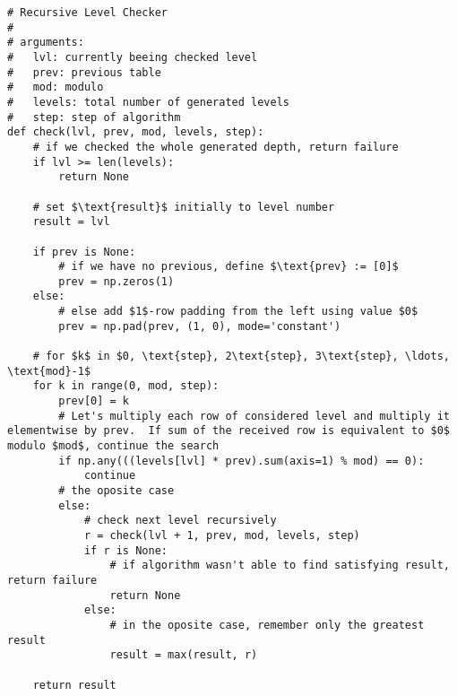 \documentclass{article}
\begin{document}
\begin{verbatim}
# Recursive Level Checker
#
# arguments:
#   lvl: currently beeing checked level
#   prev: previous table
#   mod: modulo
#   levels: total number of generated levels
#   step: step of algorithm
def check(lvl, prev, mod, levels, step):
    # if we checked the whole generated depth, return failure
    if lvl >= len(levels):
        return None

    # set $\text{result}$ initially to level number
    result = lvl

    if prev is None:
        # if we have no previous, define $\text{prev} := [0]$
        prev = np.zeros(1)
    else:
        # else add $1$-row padding from the left using value $0$
        prev = np.pad(prev, (1, 0), mode='constant')

    # for $k$ in $0, \text{step}, 2\text{step}, 3\text{step}, \ldots, \text{mod}-1$
    for k in range(0, mod, step):
        prev[0] = k
        # Let's multiply each row of considered level and multiply it elementwise by prev.  If sum of the received row is equivalent to $0$ modulo $mod$, continue the search
        if np.any(((levels[lvl] * prev).sum(axis=1) % mod) == 0):
            continue
        # the oposite case
        else:
            # check next level recursively
            r = check(lvl + 1, prev, mod, levels, step)
            if r is None:
                # if algorithm wasn't able to find satisfying result, return failure
                return None
            else:
                # in the oposite case, remember only the greatest result
                result = max(result, r)

    return result
\end{verbatim}
\end{document}
